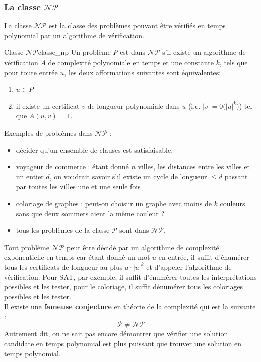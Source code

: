 \subsubsection{La classe $\mathcal{NP}$}
\label{sub:la_classe_np}
La classe $\mathcal{NP}$ est la classe des problèmes pouvant être vérifiés en temps polynomial par un algorithme de vérification.
\begin{definition}{Classe $\mathcal{NP}$}{classe_np}
    Un problème $P$ est dans $\mathcal{NP}$ s'il existe un algorithme de vérification $A$ de complexité polynomiale en temps
    et une constante $k$, tels que pour toute entrée $u$, les deux afformations suivantes sont équivalentes:
    \begin{enumerate}
        \item $u\in P$
        \item il existe un certificat $v$ de longueur polynomiale dans $u$ (i.e. $|v| = 0(|u|^k$)) tel que $A(u,v)=1$.
    \end{enumerate}
\end{definition}
\begin{example}
    Exemples de problèmes dans $\mathcal{NP}$ :
    \begin{itemize}[label=\textbullet]
        \item décider qu'un ensemble de clauses est satisfaisable.
        \item voyageur de commerce : étant donné $n$ villes, les distances entre les villes et un entier $d$, on voudrait
        savoir s'il existe un cycle de longueur $\leq d$ passant par toutes les villes une et une seule fois
        \item coloriage de graphes : peut-on choisiir un graphe avec moins de $k$ couleurs sans que deux sommets aient la 
        même couleur ?
        \item tous les problèmes de la classe $\mathcal{P}$ sont dans $\mathcal{NP}$.
    \end{itemize}
\end{example}
\begin{remark}
    Tout problème $\mathcal{NP}$ peut être décidé par un algorithme de complexité exponentielle en temps car étant donné un mot
    $u$ en entrée, il suffit d'énumérer tous les certificats de longueur au plus $a\cdot|u|^k$ et d'appeler l'algorithme de 
    vérification. Pour SAT, par exemple, il suffit d'énumérer toutes les interprétations possibles et les tester, pour le coloriage,
    il suffit dénumérer tous les coloriages possibles et les tester.\\
    Il existe une \textbf{fameuse conjecture} en théorie de la complexité qui est la suivante : 
    \begin{equation*}
        \mathcal{P}\neq\mathcal{NP}
    \end{equation*}
    Autrement dit, on ne sait pas encore démontrer que vérifier une solution candidate en temps polynomial est plus puissant que
    trouver une solution en temps polynomial.
\end{remark}

